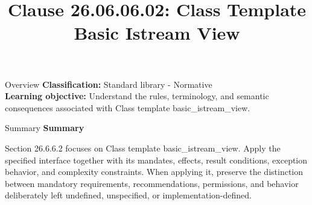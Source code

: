 \documentclass[10pt,letterpaper]{article}
\title{Clause 26.06.06.02: Class Template Basic Istream View}
\author{}
\date{}
\begin{document}
\maketitle
\begin{CornellOverviewBox}{Overview}
\textbf{Classification:} Standard library - Normative\\[2pt]
\textbf{Learning objective:} Understand the rules, terminology, and semantic consequences associated with Class template basic\_istream\_view.
\end{CornellOverviewBox}\begin{CornellSummaryBox}{Summary}
{\sffamily\bfseries\color{Accent} Summary}\par\vspace{3pt}Section 26.6.6.2 focuses on Class template basic\_istream\_view. Apply the specified interface together with its mandates, effects, result conditions, exception behavior, and complexity constraints. When applying it, preserve the distinction between mandatory requirements, recommendations, permissions, and behavior deliberately left undefined, unspecified, or implementation-defined.
\end{CornellSummaryBox}
\end{document}
